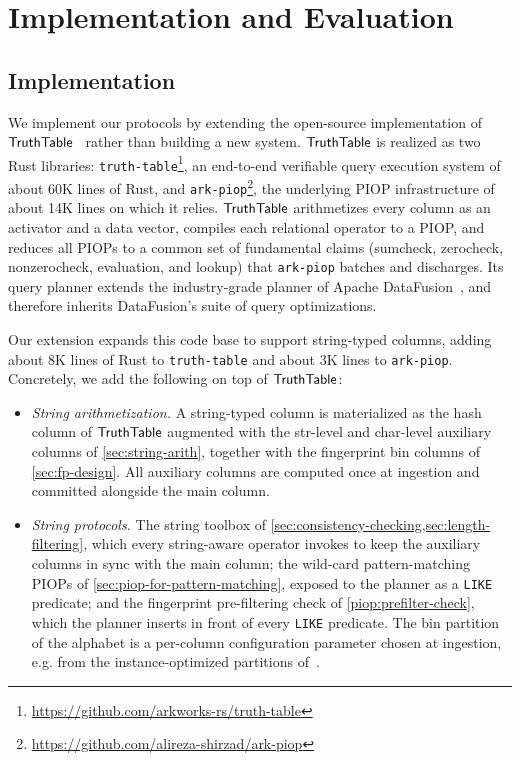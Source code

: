 \doclearpage
\section{Implementation and Evaluation}
\label{sec:impl-eval}

\subsection{Implementation}
\label{sec:implementation}

We implement our protocols by extending the open-source implementation of $\mathsf{TruthTable}$~\cite{cryptoeprint:2026/1260} rather than building a new system. $\mathsf{TruthTable}$ is realized as two Rust libraries: \texttt{truth-table}\footnote{\url{https://github.com/arkworks-rs/truth-table}}, an end-to-end verifiable query execution system of about 60K lines of Rust, and \texttt{ark-piop}\footnote{\url{https://github.com/alireza-shirzad/ark-piop}}, the underlying PIOP infrastructure of about 14K lines on which it relies. $\mathsf{TruthTable}$ arithmetizes every column as an activator and a data vector, compiles each relational operator to a PIOP, and reduces all PIOPs to a common set of fundamental claims (sumcheck, zerocheck, nonzerocheck, evaluation, and lookup) that \texttt{ark-piop} batches and discharges. Its query planner extends the industry-grade planner of Apache DataFusion~\cite{datafusion}, and therefore inherits DataFusion's suite of query optimizations.

Our extension expands this code base to support string-typed columns, adding about 8K lines of Rust to \texttt{truth-table} and about 3K lines to \texttt{ark-piop}. Concretely, we add the following on top of $\mathsf{TruthTable}$:
\begin{itemize}[nosep]
  \item \emph{String arithmetization.} A string-typed column is materialized as the hash column of $\mathsf{TruthTable}$ augmented with the str-level and char-level auxiliary columns of \cref{sec:string-arith}, together with the fingerprint bin columns of \cref{sec:fp-design}. All auxiliary columns are computed once at ingestion and committed alongside the main column.
  \item \emph{String protocols.} The string toolbox of \cref{sec:consistency-checking,sec:length-filtering}, which every string-aware operator invokes to keep the auxiliary columns in sync with the main column; the wild-card pattern-matching PIOPs of \cref{sec:piop-for-pattern-matching}, exposed to the planner as a \texttt{LIKE} predicate; and the fingerprint pre-filtering check of \cref{piop:prefilter-check}, which the planner inserts in front of every \texttt{LIKE} predicate. The bin partition of the alphabet is a per-column configuration parameter chosen at ingestion, e.g. from the instance-optimized partitions of~\cite{string_fingerprint}.
\end{itemize}

